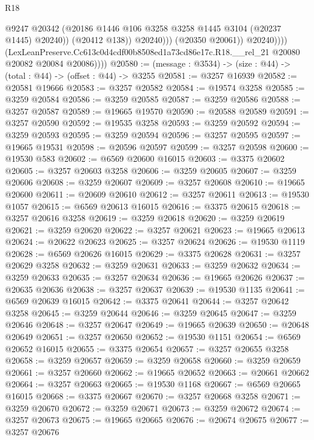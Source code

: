 \begin{lexlean}{R18}
\begin{coremodule}
                              @9247
                              @20342
                              (@20186 @1446 @106 @3258 @3258 @1445 @3104 (@20237 @1445) @20240))
                            (@20412 @138))
                          @20240)))
                    (@20350 @20061))
                  @20240))))
          (LexLeanPreserve.Cc613c0d4cdf00b8508ed1a73cd86e17c.R18.__rel_21
            @20080
            @20082
            @20084
            @20086))))
@20580 := (message : @3534) -> (size : @44) -> (total : @44) -> (offset : @44) -> @3255
@20581 := @3257 @16939
@20582 := @20581 @19666
@20583 := @3257 @20582
@20584 := @19574 @3258
@20585 := @3259 @20584
@20586 := @3259 @20585
@20587 := @3259 @20586
@20588 := @3257 @20587
@20589 := @19665 @19570
@20590 := @20588 @20589
@20591 := @3257 @20590
@20592 := @19535 @3258
@20593 := @3259 @20592
@20594 := @3259 @20593
@20595 := @3259 @20594
@20596 := @3257 @20595
@20597 := @19665 @19531
@20598 := @20596 @20597
@20599 := @3257 @20598
@20600 := @19530 @583
@20602 := @6569 @20600 @16015
@20603 := @3375 @20602
@20605 := @3257 @20603 @3258
@20606 := @3259 @20605
@20607 := @3259 @20606
@20608 := @3259 @20607
@20609 := @3257 @20608
@20610 := @19665 @20600
@20611 := @20609 @20610
@20612 := @3257 @20611
@20613 := @19530 @1057
@20615 := @6569 @20613 @16015
@20616 := @3375 @20615
@20618 := @3257 @20616 @3258
@20619 := @3259 @20618
@20620 := @3259 @20619
@20621 := @3259 @20620
@20622 := @3257 @20621
@20623 := @19665 @20613
@20624 := @20622 @20623
@20625 := @3257 @20624
@20626 := @19530 @1119
@20628 := @6569 @20626 @16015
@20629 := @3375 @20628
@20631 := @3257 @20629 @3258
@20632 := @3259 @20631
@20633 := @3259 @20632
@20634 := @3259 @20633
@20635 := @3257 @20634
@20636 := @19665 @20626
@20637 := @20635 @20636
@20638 := @3257 @20637
@20639 := @19530 @1135
@20641 := @6569 @20639 @16015
@20642 := @3375 @20641
@20644 := @3257 @20642 @3258
@20645 := @3259 @20644
@20646 := @3259 @20645
@20647 := @3259 @20646
@20648 := @3257 @20647
@20649 := @19665 @20639
@20650 := @20648 @20649
@20651 := @3257 @20650
@20652 := @19530 @1151
@20654 := @6569 @20652 @16015
@20655 := @3375 @20654
@20657 := @3257 @20655 @3258
@20658 := @3259 @20657
@20659 := @3259 @20658
@20660 := @3259 @20659
@20661 := @3257 @20660
@20662 := @19665 @20652
@20663 := @20661 @20662
@20664 := @3257 @20663
@20665 := @19530 @1168
@20667 := @6569 @20665 @16015
@20668 := @3375 @20667
@20670 := @3257 @20668 @3258
@20671 := @3259 @20670
@20672 := @3259 @20671
@20673 := @3259 @20672
@20674 := @3257 @20673
@20675 := @19665 @20665
@20676 := @20674 @20675
@20677 := @3257 @20676

\end{coremodule}
\end{lexlean}
